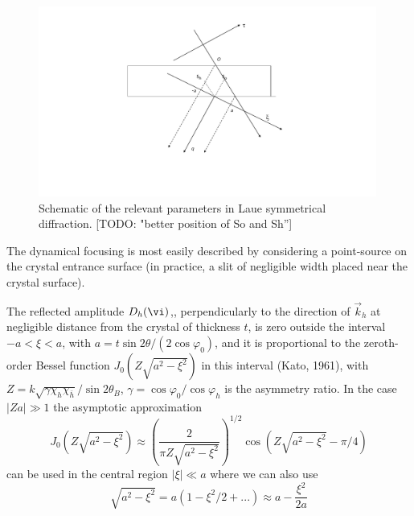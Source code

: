 \documentclass[preprint]{iucr}              %
\newcommand{\todo}[1]{{\color{red}[TODO: "#1'']}}
\newcommand{\inred}[1]{{\color{red}#1}}
\begin{document}
\begin{figure}
\label{fig:laue}
\caption{Schematic of the relevant parameters in Laue symmetrical diffraction. \todo{better position of So and Sh}
}
\includegraphics[width=0.99\textwidth,trim=7cm 2cm 5cm 1cm,clip=true]{fig_laue.pdf}
\end{figure}


The dynamical focusing is most easily described by considering a point-source on the crystal entrance surface (in practice, a slit of negligible width placed near the crystal surface). 




The reflected amplitude $D_h(\vi)$,, perpendicularly to the direction of $\vec k_h$ at negligible distance from the crystal of thickness $t$, is zero outside the interval $-a<\xi<a$, with $a=t \sin2\theta/(2 \cos\varphi_0)$, and it is proportional to the zeroth-order Bessel function  $J_0(Z\sqrt{a^2-\xi^2})$ in this interval (Kato, 1961), with  $Z=k\sqrt{\gamma\chi_h\chi_{\bar h}}/\sin2\theta_B$, $\gamma=\cos\varphi_0/\cos\varphi_h$ is the asymmetry ratio. In the case $|Za| \gg 1$ the asymptotic approximation
\begin{equation}
    J_0(Z\sqrt{a^2-\xi^2})\approx \left(\frac{2}{\pi Z \sqrt{a^2-\xi^2}}\right)^{1/2} \cos(Z\sqrt{a^2-\xi^2}-\pi/4)
\end{equation}
can be used in the central region $|\xi|\ll a$ where we can also use
\begin{equation}
     \sqrt{a^2-\xi^2} = a (1-\xi^2/2+...)\approx a - \frac{\xi^2}{2a}
\end{equation}
\end{document}
